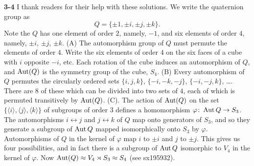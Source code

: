 \documentclass[a4paper,11pt,final,openany]{memoir}%
\theoremstyle{nonumberplain}
\begin{document}
\bigskip\noindent\textbf{3-4}
I thank readers for their help with these solutions. We write the quaternion
group as%
\[
Q=\{\pm1,\pm i,\pm j,\pm k\}.
\]
Note the $Q$ has one element of order $2$, namely, $-1$, and six
elements of order $4$, namely, $\pm i$, $\pm j$, $\pm k$.
\noindent(A) The automorphism group of $Q$ must permute the elements of order $4$.
Write the six elements of order $4$ on the six faces
of a cube with $i$ opposite $-i$, etc. Each rotation of the cube induces an
automorphism of $Q$, and $\operatorname{Aut}(Q)$ is the symmetry group of the cube, $S_{4}$.
\noindent(B) Every automorphism
of $Q$ permutes the circularly ordered sets $\{i,j,k\}$, $\{-i,-k,-j\}$,
$\{-i,-j,k\}$, \ldots.
There are $8$ of these which can be divided into two sets of $4$,
each of which is permuted
transitively by $\operatorname{Aut}(Q)$.
\noindent(C). The action of $\operatorname{Aut}(Q)$ on the set
$\{\langle i\rangle,\langle j\rangle,\langle k\rangle\}$ of subgroups
of order $3$ defines a homomorphism $\varphi\colon\operatorname{Aut}{Q}\to S_3$.
The automorphisms $i\leftrightarrow j$ and $j\leftrightarrow k$ of $Q$
map onto generators of $S_3$, and so they generate a subgroup of $\operatorname{Aut}{Q}$
mapped isomorphically onto $S_3$ by $\varphi$.
Automorphisms of $Q$ in the kernel of $\varphi$ map $i$ to $\pm i$
and $j$ to $\pm j$. This gives us four possibilities, and in fact
there is a subgroup of $\operatorname{Aut}{Q}$  isomorphic to $V_4$ in the kernel of
$\varphi$.
Now $\operatorname{Aut}(Q)\approx V_4\rtimes S_3\approx S_4$ (see sx195932).
\end{document}
